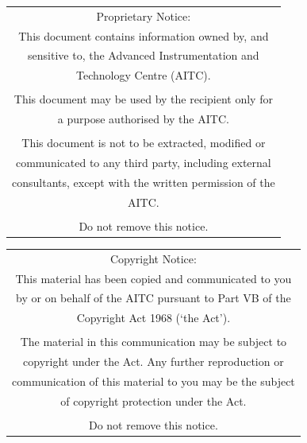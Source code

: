 \documentclass[11pt]{article}
\begin{document}
\begin{table}[!h] \centering 
 \begin{tabular}{|c|} 
 \hline

Proprietary Notice: \\
This document contains information owned by, and \\ 
sensitive to, the Advanced Instrumentation and \\
Technology Centre (AITC). \\ 
 \\
This document may be used by the recipient only for \\ 
a purpose authorised by the AITC. \\ 
 \\
This document is not to be extracted, modified or \\
communicated to any third party, including external \\
consultants, except with the written permission of the \\
AITC. \\
 \\ 
 
Do not remove this notice. \\
   \hline
   \end{tabular}
\end{table}

\begin{table}[!h] \centering 
 \begin{tabular}{|c|} 
 \hline

Copyright Notice: \\
This material has been copied and communicated to you \\ 
by or on behalf of the AITC pursuant to Part VB of the \\ 
Copyright Act 1968 (‘the Act’). \\
  \\
The material in this communication may be subject to \\
copyright under the Act. Any further reproduction or \\
communication of this material to you may be the subject \\ 
of copyright protection under the Act. \\
 \\
Do not remove this notice. \\
   \hline
   \end{tabular}
\end{table}
\end{document}
